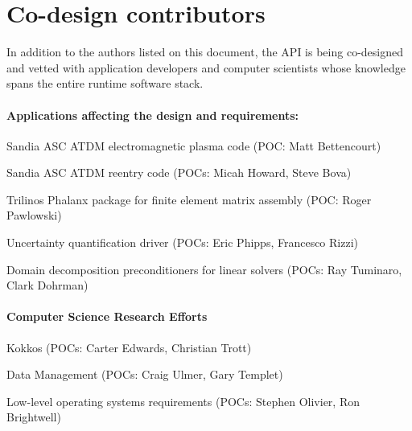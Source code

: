 \section{Co-design contributors}
In addition to the authors listed on this document,
the \gls{API} is being \gls{co-design}ed and vetted with application developers
and computer scientists whose knowledge spans the entire runtime software stack.

\paragraph{Applications affecting the design and requirements:}
\begin{compactitem}
\item Sandia \gls{ASC} \gls{ATDM} electromagnetic plasma code (POC: Matt Bettencourt)
\item Sandia \gls{ASC} \gls{ATDM} reentry code (POCs: Micah Howard, Steve Bova)
\item \gls{Trilinos} Phalanx package for finite element matrix assembly (POC: Roger Pawlowski)
\item Uncertainty quantification driver (POCs: Eric Phipps, Francesco Rizzi)
\item Domain decomposition preconditioners for linear solvers (POCs: Ray Tuminaro, Clark Dohrman)
\end{compactitem}
 
\paragraph{Computer Science Research Efforts}
\begin{compactitem}
\item Kokkos (POCs: Carter Edwards, Christian Trott)
\item Data Management (POCs: Craig Ulmer, Gary Templet)
\item Low-level operating systems requirements (POCs: Stephen Olivier, Ron
    Brightwell)
\end{compactitem}



